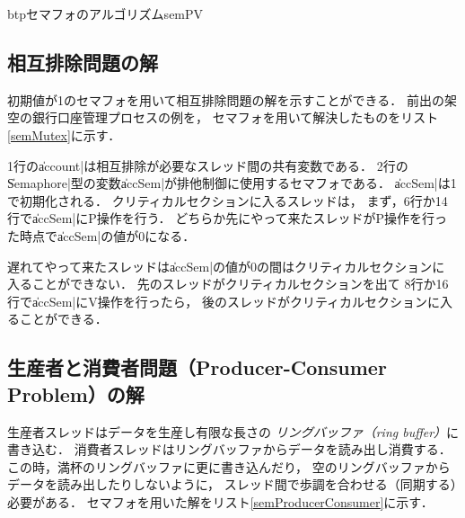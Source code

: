 \begin{myfig}{btp}{セマフォのアルゴリズム}{semPV}
  \small\begin{center}
  \begin{minipage}{0.48\columnwidth}
    
    \label{fig:semP}
  \end{minipage}\hspace{1em}
  \begin{minipage}{0.48\columnwidth}
    
    \label{fig:semV}
  \end{minipage}
  \end{center}
\end{myfig}

\subsection{相互排除問題の解}
初期値が1のセマフォを用いて相互排除問題の解を示すことができる．
前出の架空の銀行口座管理プロセスの例を，
セマフォを用いて解決したものをリスト\ref{semMutex}に示す．



1行の\|account|は相互排除が必要なスレッド間の共有変数である．
2行の\|Semaphore|型の変数\|accSem|が排他制御に使用するセマフォである．
\|accSem|は1で初期化される．
クリティカルセクションに入るスレッドは，
まず，6行か14行で\|accSem|にP操作を行う．
どちらか先にやって来たスレッドがP操作を行った時点で\|accSem|の値が0になる．

遅れてやって来たスレッドは\|accSem|の値が0の間はクリティカルセクションに
入ることができない．
先のスレッドがクリティカルセクションを出て
8行か16行で\|accSem|にV操作を行ったら，
後のスレッドがクリティカルセクションに入ることができる．

\subsection{生産者と消費者問題（Producer-Consumer Problem）の解}
生産者スレッドはデータを生産し有限な長さの
\emph{リングバッファ（ring buffer）}に書き込む．
消費者スレッドはリングバッファからデータを読み出し消費する．
この時，満杯のリングバッファに更に書き込んだり，
空のリングバッファからデータを読み出したりしないように，
スレッド間で歩調を合わせる（同期する）必要がある．
セマフォを用いた解をリスト\ref{semProducerConsumer}に示す．

